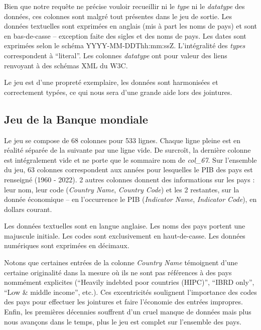 \documentclass[hidelinks, 12pt]{report}
\begin{document}
\label{nongrata}Bien que notre requête ne précise vouloir recueillir ni le \textit{type} ni le \textit{datatype} des données, ces colonnes sont malgré tout présentes dans le jeu de sortie. Les données textuelles sont exprimées en anglais (mis à part les noms de pays) et sont en bas-de-casse -- exception faite des sigles et des noms de pays. Les dates sont exprimées selon le schéma YYYY-MM-DDThh\!\!:mm\!\!:ssZ. L'intégralité des \textit{types} correspondent à \enquote{literal}. Les colonnes \textit{datatype} ont pour valeur des liens renvoyant à des schémas XML du W3C.

Le jeu est d'une propreté exemplaire, les données sont harmonisées et correctement typées, ce qui nous sera d'une grande aide lors des jointures.





%





\subsection{Jeu de la Banque mondiale}

Le jeu se compose de 68 colonnes pour 533 lignes. Chaque ligne pleine est en réalité séparée de la suivante par une ligne vide. De surcroît, la dernière colonne est intégralement vide et ne porte que le sommaire nom de \textit{col\_67}. Sur l'ensemble du jeu, 63 colonnes correspondent aux années pour lesquelles le PIB des pays est renseigné (1960 - 2022). 2 autres colonnes donnent des informations sur les pays : leur nom, leur code (\textit{Country Name}, \textit{Country Code}) et les 2 restantes, sur la donnée économique -- en l'occurrence le PIB (\textit{Indicator Name}, \textit{Indicator Code}), en dollars courant. 

Les données textuelles sont en langue anglaise. Les noms des pays portent une majuscule initiale. Les codes sont exclusivement en haut-de-casse. Les données numériques sont exprimées en décimaux.

Notons que certaines entrées de la colonne \textit{Country Name} témoignent d'une certaine originalité dans la mesure où ils ne sont pas références à des pays nommément explicites (\enquote{Heavily indebted poor countries (HIPC)}, \enquote{IBRD only}, \enquote{Low \& middle income}, etc.). Ces excentricités soulignent l'importance des codes des pays pour effectuer les jointures et faire l'économie des entrées impropres. Enfin, les premières décennies souffrent d'un cruel manque de données mais plus nous avançons dans le temps, plus le jeu est complet sur l'ensemble des pays.
\end{document}
